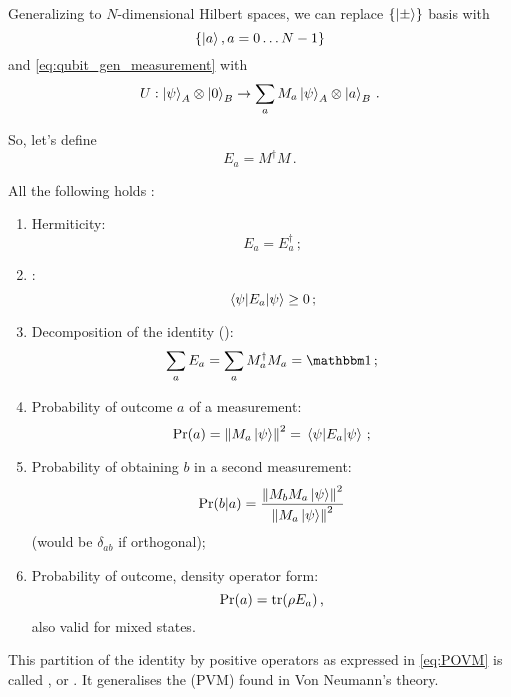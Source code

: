 Generalizing to $N$-dimensional Hilbert spaces, we can replace
$\left\{\ket{\pm}\right\}$ basis with
\[
  \left\{\ket{a}, a = 0\ldots N-1\right\}
\]
and \eqref{eq:qubit_gen_measurement} with
\begin{equation}\label{eq:gen_measurement}
  U: \ket{\psi}_A \otimes \ket{0}_B \rightarrow \sum_a M_a\ket{\psi}_A \otimes \ket{a}_B
  \,\text{.}
\end{equation}

So, let's define
\[
  E_a = M^{\dagger}M \,\text{.}
\]

\citereset
All the following holds \parencite[sec.3.1]{PreskillNotes}:
\begin{enumerate}
  \item 
    Hermiticity: \[E_a = E_a^{\dagger}\,\text{;}\]
  \item
    : \[\expval{E_a}{\psi} \geq 0\,\text{;}\]  
  \item\label{listitem:POVM}
    Decomposition of the identity ():
    \begin{equation}\label{eq:POVM}
      \sum_a E_a = \sum_a M_a^{\dagger}M_a = \idop \,\text{;}
    \end{equation}
  \item
    Probability of outcome $a$ of a measurement:
    \[\Pr(a) = \norm{M_a\ket{\psi}}^2 = \expval{E_a}{\psi}\,\text{;}\]
  \item
    Probability of obtaining $b$ in a second measurement:
    \[\Pr(b|a) = \frac{\norm{M_bM_a\ket{\psi}}^2}{\norm{M_a\ket{\psi}}^2}\]
    (would be $\delta_{ab}$ if orthogonal);
  \item
    Probability of outcome, density operator form:
    \[\Pr(a) = \tr(\rho E_a)\,\text{,}\]
    also valid for mixed states.
\end{enumerate}

This partition of the identity by positive operators
as expressed in \eqref{eq:POVM} is called
, or .
It generalises the  (PVM)
found in Von Neumann's theory.

